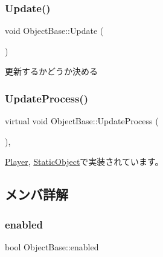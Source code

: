 \subsubsection{\texorpdfstring{Update()}{Update()}}
{\footnotesize\ttfamily void Object\+Base\+::\+Update (\begin{DoxyParamCaption}{ }\end{DoxyParamCaption})}



更新するかどうか決める 

\mbox{\label{class_object_base_a8b5b72b363a419767efde0b0e692ea95}} 
\subsubsection{\texorpdfstring{Update\+Process()}{UpdateProcess()}}
{\footnotesize\ttfamily virtual void Object\+Base\+::\+Update\+Process (\begin{DoxyParamCaption}{ }\end{DoxyParamCaption})\hspace{0.3cm}{\ttfamily [protected]}, {}}



\mbox{\hyperlink{class_player_ab8accc9b83b030f5313f1b4872a7e634}{Player}}, \mbox{\hyperlink{class_static_object_a0dd0ec514aa597a1dd83a1168902a079}{Static\+Object}}で実装されています。



\subsection{メンバ詳解}
\mbox{\label{class_object_base_ade1c868f20653a6fa5236544120eca2b}} 
\subsubsection{\texorpdfstring{enabled}{enabled}}
{\footnotesize\ttfamily bool Object\+Base\+::enabled}

\mbox{\label{class_object_base_aff7eb5482ca9bc1cd30b84994d0dad8b}} 
